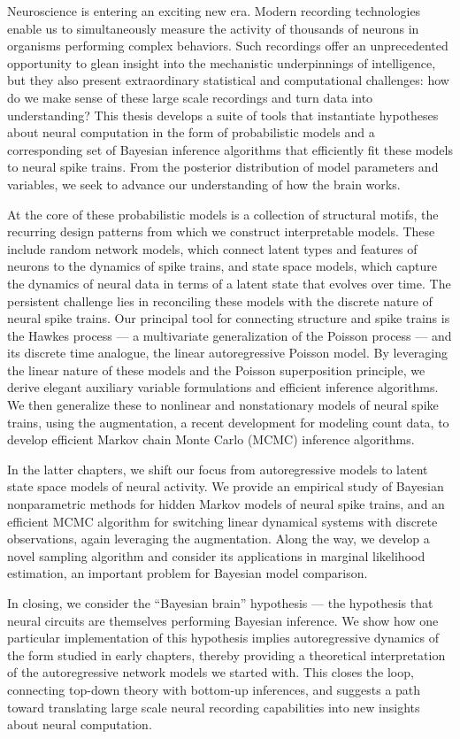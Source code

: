 Neuroscience is entering an exciting new era.  Modern recording
technologies enable us to simultaneously measure the activity of
thousands of neurons in organisms performing complex behaviors.  Such
recordings offer an unprecedented opportunity to glean insight into
the mechanistic underpinnings of intelligence, but they also present
extraordinary statistical and computational challenges: how do we make
sense of these large scale recordings and turn data into
understanding? This thesis develops a suite of tools that instantiate
hypotheses about neural computation in the form of
probabilistic models and a corresponding set of Bayesian inference
algorithms that efficiently fit these models to neural spike trains.
From the posterior distribution of model parameters and variables,
we seek to advance our understanding of how the brain works. 

At the core of these probabilistic models is a collection of
structural motifs, the recurring design patterns from which we
construct interpretable models. These include random network models,
which connect latent types and features of neurons to the dynamics of
spike trains, and state space models, which capture the dynamics of
neural data in terms of a latent state that evolves over time.  The
persistent challenge lies in reconciling these models with the
discrete nature of neural spike trains.  Our principal tool for
connecting structure and spike trains is the Hawkes process --- a
multivariate generalization of the Poisson process --- and its
discrete time analogue, the linear autoregressive Poisson model.  By
leveraging the linear nature of these models and the Poisson
superposition principle, we derive elegant auxiliary variable
formulations and efficient inference algorithms. We then generalize
these to nonlinear and nonstationary models of neural spike trains, 
using the \polyagamma augmentation, a recent development for modeling
count data, to develop efficient Markov chain Monte Carlo (MCMC)
inference algorithms.

In the latter chapters, we shift our focus from autoregressive models
to latent state space models of neural activity. We provide an
empirical study of Bayesian nonparametric methods for hidden Markov
models of neural spike trains, and an efficient MCMC algorithm for
switching linear dynamical systems with discrete observations, again
leveraging the \polyagamma augmentation. Along the way, we develop
a novel \polyagamma sampling algorithm and consider its applications in
marginal likelihood estimation, an important problem for Bayesian
model comparison.

In closing, we consider the ``Bayesian brain'' hypothesis --- the
hypothesis that neural circuits are themselves performing Bayesian
inference.  We show how one particular implementation of this
hypothesis implies autoregressive dynamics of the form studied
in early chapters, thereby providing a theoretical interpretation of
the autoregressive network models we started with.  This closes the
loop, connecting top-down theory with bottom-up inferences, and
suggests a path toward translating large scale neural recording
capabilities into new insights about neural computation.


